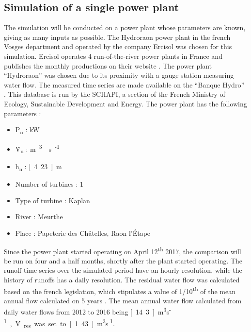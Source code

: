\subsection{Simulation of a single power plant}
\label{sub:metho_single}
The simulation will be conducted on a power plant whose parameters are known, giving as many inputs as possible. The Hydroraon power plant in the french Vosges department and operated by the company Ercisol was chosen for this simulation. Ercisol operates 4 run-of-the-river power plants in France and publishes the monthly productions on their website \cite{ercisol}. The power plant ``Hydroraon'' was chosen due to its proximity with a gauge station measuring water flow. The measured time series are made available on the ``Banque Hydro'' \cite{eaufrance}. This database is run by the SCHAPI, a section of the French Ministry of Ecology, Sustainable Development and Energy. \newline
The power plant has the following parameters :
\begin{itemize}
\itemsep0em
 \item P\textsubscript{n} \tabto{4cm}: \unit[400]{kW}
 \item \.V\textsubscript{n} \tabto{4cm}: \unit[12]{m\textsuperscript{3}\textperiodcentered s\textsuperscript{-1}}
 \item h\textsubscript{n} \tabto{4cm}: \unit[4.23]{m}
 \item Number of turbines \tabto{4cm}: 1
 \item Type of turbine \tabto{4cm}: Kaplan
 \item River \tabto{4cm}: Meurthe
 \item Place \tabto{4cm}: Papeterie des Châtelles, Raon l'Étape
\end{itemize}
Since the power plant started operating on April 12\textsuperscript{th} 2017, the comparison will be run on four and a half months, shortly after the plant started operating. The runoff time series over the simulated period have an hourly resolution, while the history of runoffs has a daily resolution. The residual water flow was calculated based on the french legislation, which stipulates a value of 1/10\textsuperscript{th} of the mean annual flow calculated on 5 years \cite{sage}. The mean annual water flow calculated from daily water flows from 2012 to 2016 being \unit[14.3]{m\textsuperscript{3}\textperiodcentered s\textsuperscript{-1}}, \.V\textsubscript{res} was set to \unit[1.43]{m\textsuperscript{3}\textperiodcentered s\textsuperscript{-1}}.

